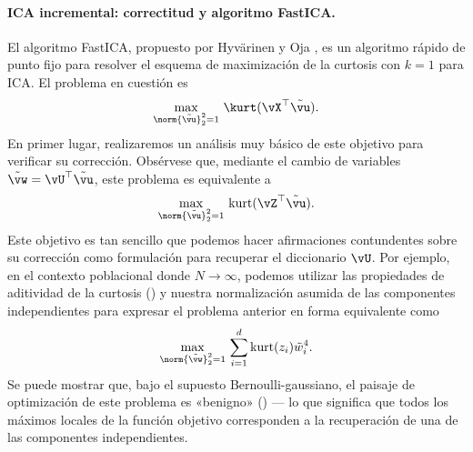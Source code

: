 \documentclass[../../book-main.tex]{subfiles}
\begin{document}
\paragraph{ICA incremental: correctitud y algoritmo FastICA.}
El algoritmo FastICA, propuesto por Hyvärinen y Oja
\cite{hyvarinen-1997}, es un algoritmo rápido de punto fijo para resolver
el esquema de maximización de la curtosis con $k=1$ para ICA.
El problema en cuestión es
\begin{equation}\label{eq:kurtosis-maximization-sphere-finitesample}
    \max_{\norm{\tilde{\vu}}_2^2 = 1}\, \kurt(\vX^\top \tilde{\vu}).
\end{equation}
En primer lugar, realizaremos un análisis muy básico de este objetivo para
verificar su corrección. Obsérvese que, mediante el cambio de variables $\tilde{\vw} =
\vU^\top \tilde{\vu}$, este problema es equivalente a
\begin{equation*}
    \max_{\norm{\tilde{\vu}}_2^2 = 1}\,
    \mathrm{kurt}(\vZ^\top \tilde{\vu}).
\end{equation*}
Este objetivo es tan sencillo que podemos hacer afirmaciones contundentes
sobre su corrección como formulación para recuperar el diccionario $\vU$.
Por ejemplo, en el contexto poblacional donde $N \to \infty$,
podemos utilizar las propiedades de aditividad de la curtosis
() y nuestra 
normalización asumida de las componentes independientes para expresar el problema anterior
en forma equivalente como
\begin{equation}\label{eq:kurtosis-maximization-sphere-population-simple}
    \max_{\norm{\tilde{\vw}}_2^2 = 1}\,
    \sum_{i=1}^d \mathrm{kurt}(z_i) \tilde{w}_i^4.
\end{equation}
Se puede mostrar que, bajo el supuesto Bernoulli-gaussiano, el
paisaje de optimización de este problema es «benigno»
() --- lo que significa que todos los máximos locales
de la función objetivo corresponden a la recuperación de una de
las componentes independientes.
\end{document}
